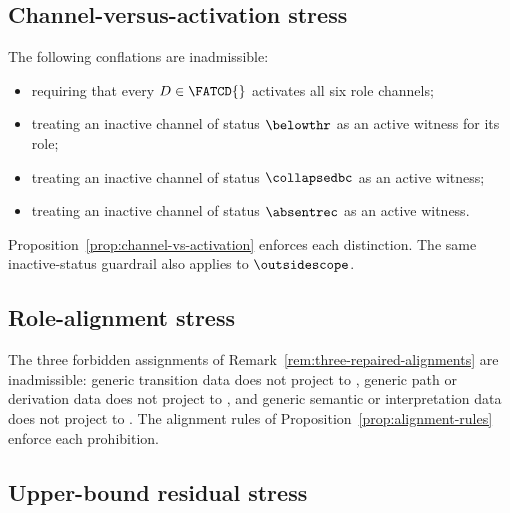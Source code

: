 \subsection{Channel-versus-activation stress}\label{subsec:channel-activation-stress}

\begin{proposition}\label{prop:channel-activation-stress}
The following conflations are inadmissible:
\begin{itemize}[topsep=2pt,itemsep=1pt]
  \item requiring that every \(D \in \FATCD{}\) activates all six role
    channels;
  \item treating an inactive channel of status \(\belowthr\) as an
    active witness for its role;
  \item treating an inactive channel of status \(\collapsedbc\) as an
    active witness;
  \item treating an inactive channel of status \(\absentrec\) as an
    active witness.
\end{itemize}
Proposition~\ref{prop:channel-vs-activation} enforces each distinction.
The same inactive-status guardrail also applies to
\(\outsidescope\).
\end{proposition}

\subsection{Role-alignment stress}\label{subsec:role-alignment-stress}

\begin{proposition}\label{prop:role-alignment-stress}
The three forbidden assignments of
Remark~\ref{rem:three-repaired-alignments} are inadmissible: generic
transition data does not project to \Pthree{}, generic path or
derivation data does not project to \Pfive{}, and generic semantic or
interpretation data does not project to \Pone{}. The alignment rules
of Proposition~\ref{prop:alignment-rules} enforce each prohibition.
\end{proposition}

\subsection{Upper-bound residual stress}\label{subsec:upper-bound-residual-stress}

